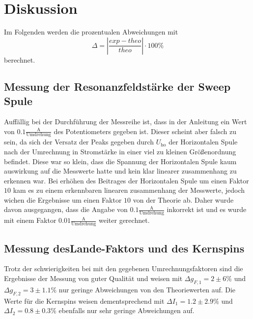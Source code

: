 \section{Diskussion}
\label{sec:Diskussion}
Im Folgenden werden die prozentualen Abweichungen mit 
\begin{equation}\label{eq:1}
    \Delta = |\frac{exp - theo}{theo}|\cdot 100\%
\end{equation}
berechnet.
\subsection{Messung der Resonanzfeldstärke der Sweep Spule}
Auffällig bei der Durchführung der Messreihe ist, dass in der Anleitung ein Wert von $0.1 \frac{\mathrm{A}}{\text{Umdrehung}}$ des Potentiometers gegeben ist. Dieser scheint aber falsch zu sein, da
sich der Versatz der Peaks gegeben durch $U_{\text{ho}}$ der Horizontalen Spule nach der Umrechnung in Stromstärke in einer viel zu kleinen Größenordnung befindet. Diese war so klein, dass die Spannung der Horizontalen Spule kaum auswirkung auf die Messwerte hatte und kein klar linearer zusammenhang zu erkennen war.
Bei erhöhen des Beitrages der Horizontalen Spule um einen Faktor $10$ kam es zu einem erkennbaren linearen zusammenhang der Messwerte, jedoch wichen die Ergebnisse um einen Faktor $10$ von der Theorie ab. Daher wurde davon ausgegangen, dass die Angabe von $0.1 \frac{\mathrm{A}}{\text{Umdrehung}}$ inkorrekt ist und es wurde mit einem Faktor $0.01 \frac{\mathrm{A}}{\text{Umdrehung}}$ weiter gerechnet.
\subsection{Messung desLande-Faktors und des Kernspins}
Trotz der schwierigkeiten bei mit den gegebenen Umrechnungsfaktoren sind die Ergebnisse der Messung von guter Qualität und weisen mit $\Delta g_{F,1} = 2 \pm 6 \%$ und $\Delta g_{F,2} = 3 \pm 1.1 \%$ nur geringe Abweichungen von den Theoriewerten auf. Die Werte für die Kernspins weisen dementsprechend mit 
$\Delta I_{1} = 1.2 \pm 2.9 \%$ und $\Delta I_{2} = 0.8 \pm 0.3 \%$ ebenfalls nur sehr geringe Abweichungen auf.
\newpage